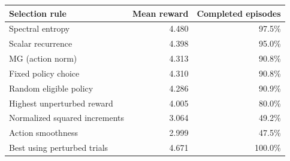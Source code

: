 \begin{tabular}{lrr}
\toprule
Selection rule & Mean reward & Completed episodes \\
\midrule
Spectral entropy & 4.480 & 97.5\% \\
Scalar recurrence & 4.398 & 95.0\% \\
MG (action norm) & 4.313 & 90.8\% \\
Fixed policy choice & 4.310 & 90.8\% \\
Random eligible policy & 4.286 & 90.9\% \\
Highest unperturbed reward & 4.005 & 80.0\% \\
Normalized squared increments & 3.064 & 49.2\% \\
Action smoothness & 2.999 & 47.5\% \\
\addlinespace
Best using perturbed trials & 4.671 & 100.0\% \\
\bottomrule
\end{tabular}
